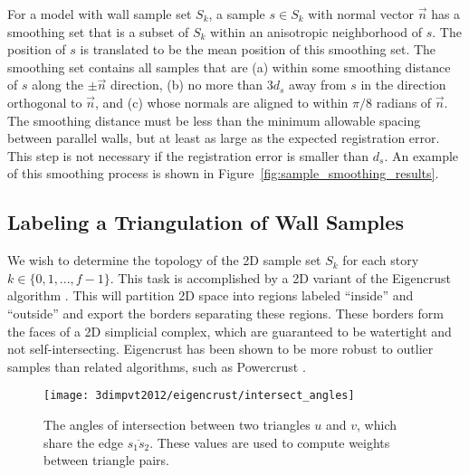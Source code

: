 \documentclass[12pt,onecolumn,oneside]{book}
\begin{document}
For a model with wall sample set $S_k$, a sample $s \in S_k$ with normal vector $\vec{n}$ has a smoothing set that is a subset of $S_k$ within an anisotropic neighborhood of $s$.  The position of $s$ is translated to be the mean position of this smoothing set. The smoothing set contains all samples that are (a) within some smoothing distance of $s$ along the $\pm \vec{n}$ direction, (b) no more than $3 d_s$ away from $s$ in the direction orthogonal to $\vec{n}$, and (c) whose normals are aligned to within $\pi/8$ radians of $\vec{n}$.  The smoothing distance must be less than the minimum allowable spacing between parallel walls, but at least as large as the expected registration error.  This step is not necessary if the registration error is smaller than $d_s$.  An example of this smoothing process is shown in Figure~\ref{fig:sample_smoothing_results}.

\subsection{Labeling a Triangulation of Wall Samples}
\label{ssec:eigencrust_triangulation}

We wish to determine the topology of the 2D sample set $S_k$ for each story $k \in \{ 0, 1, ..., f-1 \}$.  This task is accomplished by a 2D variant of the Eigencrust algorithm \cite{EigencrustShewchuk}.  This will partition 2D space into regions labeled ``inside'' and ``outside'' and export the borders separating these regions.  These borders form the faces of a 2D simplicial complex, which are guaranteed to be watertight and not self-intersecting.  Eigencrust has been shown to be more robust to outlier samples than related algorithms, such as Powercrust \cite{EigencrustShewchuk, Powercrust}.

\begin{figure}[t]

\begin{minipage}[b]{1.0\linewidth}
  \centering
  \centerline{\texttt{[image: 3dimpvt2012/eigencrust/intersect\_angles]}}
\end{minipage}

\caption[Computing weighting between triangle pairs.]{The angles of intersection between two triangles $u$ and $v$, which share the edge $\overline{s_1 s_2}$. These values are used to compute weights between triangle pairs.}
\label{fig:intersect_angles}

\end{figure}
\end{document}
